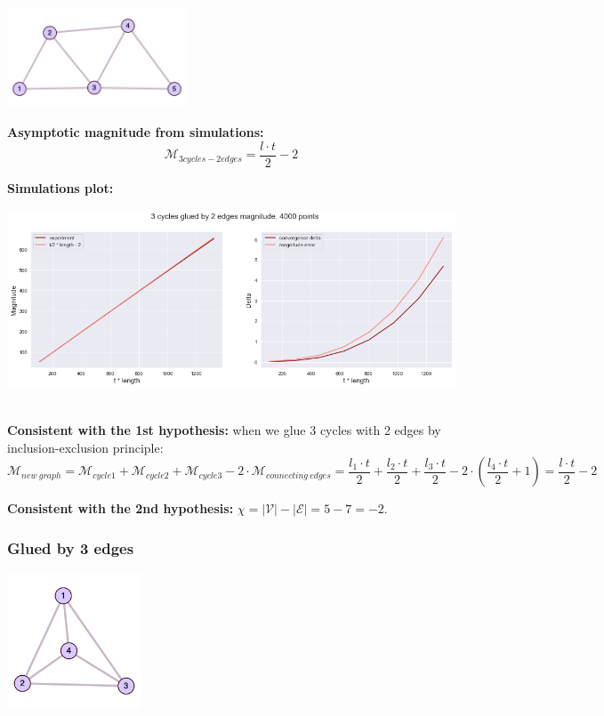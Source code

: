\documentclass{article}
\begin{document}
\begin{center}
\includegraphics[width=0.4\textwidth]{3cicles_2e_exp} \ \ \ \ \
\end{center}

\textbf{Asymptotic magnitude from simulations:}
\\

$$\mathcal{M}_{3cycles-2edges} = \frac{l \cdot t}{2} - 2$$

\textbf{Simulations plot:}
\begin{center}
\includegraphics[width=\textwidth]{3cycles2edges_plot} \ \ \ \ \
\end{center}

\textbf{Consistent with the 1st hypothesis:} when we glue 3 cycles with 2 edges by inclusion-exclusion
principle: $$\mathcal{M}_{new \ graph} = \mathcal{M}_{cycle1} + \mathcal{M}_{cycle2} + \mathcal{M}_{cycle3}
- 2 \cdot \mathcal{M}_{connecting \ edges} = \frac{l_1 \cdot t}{2} + \frac{l_2 \cdot t}{2} + \frac{l_3 \cdot t}{2} - 2 \cdot (\frac{l_4 \cdot t}{2} + 1)
= \frac{l \cdot t}{2} - 2$$ 

\textbf{Consistent with the 2nd hypothesis:} $\chi = |\mathcal{V}| - |\mathcal{E}| = 5 - 7 = -2$.


\subsubsection{Glued by 3 edges}

\begin{center}
\includegraphics[width=0.3\textwidth]{3cicles_3e_exp}
\end{center}
\end{document}
